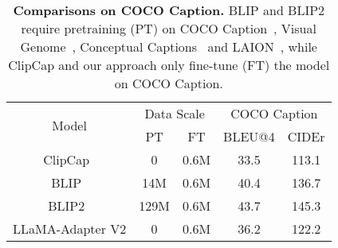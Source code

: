 \documentclass[10pt,twocolumn,letterpaper]{article}
\begin{document}
\begin{table}[t]
\centering
\small
\begin{tabular}{c|cc|cc}
\toprule
\multirow{2}{*}{Model} & \multicolumn{2}{c|}{Data Scale} & \multicolumn{2}{c}{COCO Caption} \\
                       & PT      & FT      & BLEU@4          & CIDEr          \\
\midrule
ClipCap~\cite{mokady2021clipcap}                & 0             & 0.6M           & 33.5            & 113.1          \\
BLIP~\cite{li2022blip}                   & 14M           & 0.6M           & 40.4            & 136.7          \\
BLIP2~\cite{li2023blip}                  & 129M          & 0.6M           & 43.7            & 145.3          \\
\midrule
LLaMA-Adapter V2         & 0             & 0.6M           & 36.2            & 122.2\\
\bottomrule
\end{tabular}\caption{\textbf{Comparisons on COCO Caption.} BLIP and BLIP2 require pretraining (PT) on COCO Caption~\cite{chen2015microsoft}, Visual Genome~\cite{krishna2017visual}, Conceptual Captions~\cite{sharma2018conceptual,changpinyo2021conceptual} and LAION~\cite{schuhmann2021laion}, while ClipCap and our approach only fine-tune (FT) the model on COCO Caption.}
\label{tab:coco_cap}
\end{table} 
\end{document}
